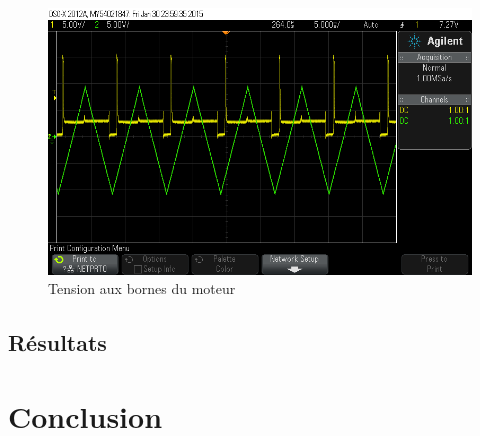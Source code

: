 \documentclass[a4paper]{article}
\begin{document}
\begin{figure}[h!]
  \centering
    \includegraphics[width=1\textwidth]{scope_3}
  \caption{Tension aux bornes du moteur}
\end{figure}

\subsection{Résultats}

\section{Conclusion}
\end{document}

